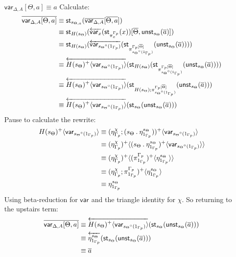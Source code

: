 \documentclass[10pt]{article}
\theoremstyle{definition}
\newcommand{\rewrite}[2]{\overleftarrow{#1}(#2)}
\newcommand\StI[2]{\ensuremath{\mathsf{st}_{#1}(#2)}}
\newcommand\UnSt[2]{\ensuremath{\mathsf{unst}_{#1}(#2)}}
\newcommand\TrCirc[2]{\ensuremath{{#1}^\circ(#2)}}
\newcommand\var[1]{\ensuremath{\mathsf{var}_{#1}}}
\newcommand\ap[2]{\ensuremath{#1 \langle #2 \rangle }}
\newcommand\bdot[0]{\mathbin{.}}
\begin{document}
\begin{enumerate}[style = multiline, labelwidth = 80pt]
\item[{$\var{\Delta,A}[\Theta, a] \equiv a$}] Calculate:
\begin{align*}
\upstairs{\var{\Delta,A}[\Theta, a]}
&\equiv \StI{s_{\Theta, a}}{\upstairs{\var{\Delta, A}}[\upstairs{\Theta, a}]} \\
&\equiv \StI{H(s_\Theta)}{\rewrite{\var{x}}{\StI{\pi^{\asdep{\Gamma}}_x}{x}}[\upstairs{\Theta}, \UnSt{s_\Theta}{\upstairs{a}}]} \\
&\equiv \StI{H(s_\Theta)}{\rewrite{\var{\TrCirc{s_\Theta}{1_{\asdep{\Gamma}}}}}{\StI{\pi^{\asdep{\Gamma}[\upstairs{\Theta}]}_{\TrCirc{s_\Theta}{1_{\asdep{\Gamma}}}}}{\UnSt{s_\Theta}{\upstairs{a}}}}} \\
&\equiv \rewrite{\ap{H(s_\Theta)^+}{\var{\TrCirc{s_\Theta}{1_{\asdep{\Gamma}}}}}}{\StI{H(s_\Theta)}{\StI{\pi^{\asdep{\Gamma}[\upstairs{\Theta}]}_{\TrCirc{s_\Theta}{1_{\asdep{\Gamma}}}}}{\UnSt{s_\Theta}{\upstairs{a}}}}} \\
&\equiv \rewrite{\ap{H(s_\Theta)^+}{\var{\TrCirc{s_\Theta}{1_{\asdep{\Gamma}}}}}}{\StI{H(s_\Theta);\pi^{\asdep{\Gamma}[\upstairs{\Theta}]}_{\TrCirc{s_\Theta}{1_{\asdep{\Gamma}}}}}{\UnSt{s_\Theta}{\upstairs{a}}}} \\
&\equiv \rewrite{\ap{H(s_\Theta)^+}{\var{\TrCirc{s_\Theta}{1_{\asdep{\Gamma}}}}}}{\StI{s_\Theta}{\UnSt{s_\Theta}{\upstairs{a}}}}
\end{align*}
Pause to calculate the rewrite:
\begin{align*}
\ap{H(s_\Theta)^+}{\var{\TrCirc{s_\Theta}{1_{\asdep{\Gamma}}}}}
&\equiv \ap{(\eta^\chi_{\asdep{\Gamma}}; (s_\Theta \bdot \eta_{1_{\asdep{\Gamma}}}^{s_\Theta}))^+}{\var{\TrCirc{s_\Theta}{1_{\asdep{\Gamma}}}}} \\
&\equiv \ap{(\eta^\chi_{\asdep{\Gamma}})^+}{\ap{(s_\Theta \bdot \eta_{1_{\asdep{\Gamma}}}^{s_\Theta})^+}{\var{\TrCirc{s_\Theta}{1_{\asdep{\Gamma}}}}}} \\
&\equiv \ap{(\eta^\chi_{\asdep{\Gamma}})^+}{\ap{(\pi^{\asdep{\Gamma}}_{1_{\asdep{\Gamma}}})^+}{\eta_{1_{\asdep{\Gamma}}}^{s_\Theta}}} \\
&\equiv \ap{(\eta^\chi_{\asdep{\Gamma}};\pi^{\asdep{\Gamma}}_{1_{\asdep{\Gamma}}})^+}{\eta_{1_{\asdep{\Gamma}}}^{s_\Theta}} \\
&\equiv \eta_{1_{\asdep{\Gamma}}}^{s_\Theta}
\end{align*}
Using beta-reduction for $\var{}$ and the triangle identity for $\chi$. So returning to the upstairs term:
\begin{align*}
\upstairs{\var{\Delta,A}[\Theta, a]}
&\equiv \rewrite{\ap{H(s_\Theta)^+}{\var{\TrCirc{s_\Theta}{1_{\asdep{\Gamma}}}}}}{\StI{s_\Theta}{\UnSt{s_\Theta}{\upstairs{a}}}} \\
&\equiv \rewrite{\eta_{1_{\asdep{\Gamma}}}^{s_\Theta}}{\StI{s_\Theta}{\UnSt{s_\Theta}{\upstairs{a}}}} \\
&\equiv \upstairs{a}
\end{align*}


\end{enumerate}
\end{document}
